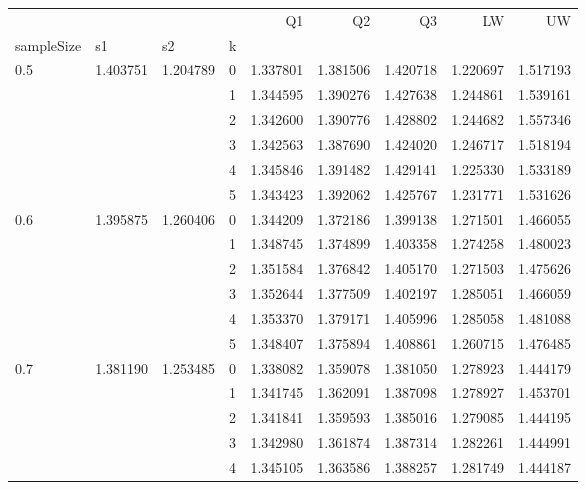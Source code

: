 \begin{tabular}{llllrrrrr}
\toprule
    &          &          &   &        Q1 &        Q2 &        Q3 &        LW &        UW \\
sampleSize & s1 & s2 & k &           &           &           &           &           \\
\midrule
0.5 & 1.403751 & 1.204789 & 0 &  1.337801 &  1.381506 &  1.420718 &  1.220697 &  1.517193 \\
    &          &          & 1 &  1.344595 &  1.390276 &  1.427638 &  1.244861 &  1.539161 \\
    &          &          & 2 &  1.342600 &  1.390776 &  1.428802 &  1.244682 &  1.557346 \\
    &          &          & 3 &  1.342563 &  1.387690 &  1.424020 &  1.246717 &  1.518194 \\
    &          &          & 4 &  1.345846 &  1.391482 &  1.429141 &  1.225330 &  1.533189 \\
    &          &          & 5 &  1.343423 &  1.392062 &  1.425767 &  1.231771 &  1.531626 \\
0.6 & 1.395875 & 1.260406 & 0 &  1.344209 &  1.372186 &  1.399138 &  1.271501 &  1.466055 \\
    &          &          & 1 &  1.348745 &  1.374899 &  1.403358 &  1.274258 &  1.480023 \\
    &          &          & 2 &  1.351584 &  1.376842 &  1.405170 &  1.271503 &  1.475626 \\
    &          &          & 3 &  1.352644 &  1.377509 &  1.402197 &  1.285051 &  1.466059 \\
    &          &          & 4 &  1.353370 &  1.379171 &  1.405996 &  1.285058 &  1.481088 \\
    &          &          & 5 &  1.348407 &  1.375894 &  1.408861 &  1.260715 &  1.476485 \\
0.7 & 1.381190 & 1.253485 & 0 &  1.338082 &  1.359078 &  1.381050 &  1.278923 &  1.444179 \\
    &          &          & 1 &  1.341745 &  1.362091 &  1.387098 &  1.278927 &  1.453701 \\
    &          &          & 2 &  1.341841 &  1.359593 &  1.385016 &  1.279085 &  1.444195 \\
    &          &          & 3 &  1.342980 &  1.361874 &  1.387314 &  1.282261 &  1.444991 \\
    &          &          & 4 &  1.345105 &  1.363586 &  1.388257 &  1.281749 &  1.444187 \\

\end{tabular}
